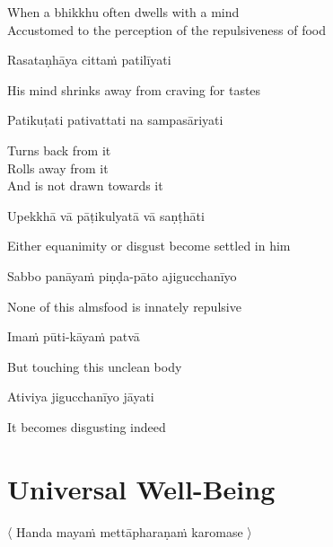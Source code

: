 \begin{english}
  When a bhikkhu often dwells with a mind\\
  Accustomed to the perception of the repulsiveness of food
\end{english}

Rasataṇhāya cittaṁ patilīyati

\begin{english}
  His mind shrinks away from craving for tastes
\end{english}

Patikuṭati pativattati na sampasāriyati

\begin{english}
  Turns back from it\\
  Rolls away from it\\
  And is not drawn towards it
\end{english}

Upekkhā vā pāṭikulyatā vā saṇṭhāti

\begin{english}
  Either equanimity or disgust become settled in him
\end{english}

\suttaRef{[AN 7.49]}

Sabbo panāyaṁ piṇḍa-pāto ajigucchanīyo

\begin{english}
  None of this almsfood is innately repulsive
\end{english}

Imaṁ pūti-kāyaṁ patvā

\begin{english}
  But touching this unclean body
\end{english}

Ativiya jigucchanīyo jāyati

\begin{english}
  It becomes disgusting indeed
\end{english}

\suttaRef{[Trad]}


\section{Universal Well-Being}
\label{universal-well-being}

\begin{leader}
  〈 Handa mayaṁ mettāpharaṇaṁ karomase 〉
\end{leader}

